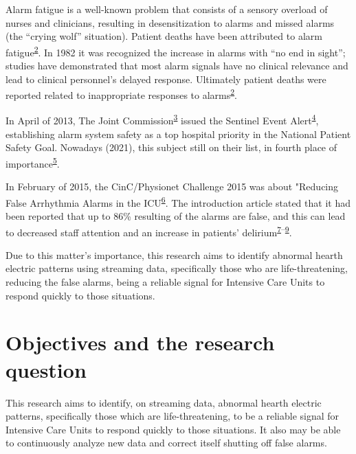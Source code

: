 \documentclass[12pt,twoside]{reedthesis}
\begin{document}
Alarm fatigue is a well-known problem that consists of a sensory overload of nurses and clinicians, resulting in
desensitization to alarms and missed alarms (the ``crying wolf'' situation). Patient deaths have been attributed to alarm
fatigue\textsuperscript{\protect\hyperlink{ref-sendelbach2013}{2}}. In 1982 it was recognized the increase in alarms with ``no end in sight''; studies have
demonstrated that most alarm signals have no clinical relevance and lead to clinical personnel's delayed response.
Ultimately patient deaths were reported related to inappropriate responses to alarms\textsuperscript{\protect\hyperlink{ref-sendelbach2013}{2}}.

In April of 2013, The Joint Commission\textsuperscript{\protect\hyperlink{ref-the_jc}{3}} issued the Sentinel Event Alert\textsuperscript{\protect\hyperlink{ref-JointCommission2013}{4}}, establishing
alarm system safety as a top hospital priority in the National Patient Safety Goal. Nowadays (2021), this subject still
on their list, in fourth place of importance\textsuperscript{\protect\hyperlink{ref-the_jc2021}{5}}.

In February of 2015, the CinC/Physionet Challenge 2015 was about "Reducing False Arrhythmia Alarms in the
ICU\textsuperscript{\protect\hyperlink{ref-Clifford2015}{6}}. The introduction article stated that it had been reported that up to 86\% resulting of the alarms are
false, and this can lead to decreased staff attention and an increase in patients' delirium\textsuperscript{\protect\hyperlink{ref-Lawless1994}{7}--\protect\hyperlink{ref-Parthasarathy2004}{9}}.

Due to this matter's importance, this research aims to identify abnormal hearth electric patterns using streaming data,
specifically those who are life-threatening, reducing the false alarms, being a reliable signal for Intensive Care Units
to respond quickly to those situations.

\hypertarget{objectives-and-the-research-question}{%
\chapter{Objectives and the research question}\label{objectives-and-the-research-question}}

This research aims to identify, on streaming data, abnormal hearth electric patterns, specifically those which are
life-threatening, to be a reliable signal for Intensive Care Units to respond quickly to those situations. It also may
be able to continuously analyze new data and correct itself shutting off false alarms.
\end{document}
